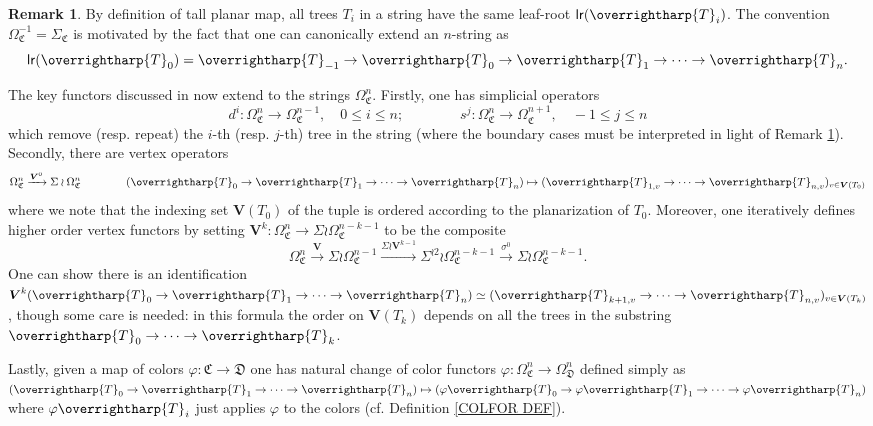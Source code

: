 \documentclass[a4paper,10pt
,draft
]{article}%
\numberwithin{equation}{section}
\numberwithin{figure}{section}
\theoremstyle{definition} %
\newtheorem{remark}[equation]{Remark}%
\newcommand{\vect}[1]{\text{\overrightharp{\ensuremath{#1}}}}
\newcommand{\1}{\ensuremath{\mathbbm 1}}%
\begin{document}
\begin{remark}\label{ADDCOROL REM}
	By definition of tall planar map, 
	all trees $T_i$ in a string have the same leaf-root
	$\mathsf{lr}(\vect{T}_i)$. The convention $\Omega^{-1}_{\mathfrak{C}} = \Sigma_{\mathfrak{C}}$ 
	is motivated by the fact that one can 
	canonically extend an $n$-string as
	\[\mathsf{lr}(\vect{T}_0)=\vect{T}_{-1} \to \vect{T}_0 \to \vect{T}_1 \to \cdots \to \vect{T}_n.\]
\end{remark}




The key functors discussed in \cite[\S 3.4]{BP_geo} now extend to the strings
$\Omega_{\mathfrak{C}}^n$.
Firstly, one has simplicial operators
\[
d^i \colon \Omega_{\mathfrak{C}}^n \to \Omega_{\mathfrak{C}}^{n-1},
\quad 0 \leq i \leq n;
\qquad \qquad
s^j \colon \Omega_{\mathfrak{C}}^{n} \to \Omega_{\mathfrak{C}}^{n+1},
\quad -1 \leq j \leq n
\]
which remove (resp. repeat) the $i$-th (resp. $j$-th) tree in the string (where the boundary cases must be interpreted in light of 
Remark \ref{ADDCOROL REM}).
Secondly, there are vertex operators
\[
\Omega^{n}_{\mathfrak{C}}
\xrightarrow{\boldsymbol{V}^0}
\Sigma \wr \Omega^{n}_{\mathfrak{C}}
\qquad \qquad
(\vect{T}_0 \to \vect{T}_1 \to \cdots \to \vect{T}_n)
\mapsto
(\vect{T}_{1,v} \to \cdots \to \vect{T}_{n,v})_{v \in \boldsymbol{V}(T_0)}
\]
where we note that the indexing set 
$\boldsymbol{V}(T_0)$ of the tuple
is ordered according to the planarization of $T_0$.
Moreover, one iteratively defines higher order vertex functors
by setting 
$\boldsymbol{V}^{k}\colon \Omega^{n}_{\mathfrak{C}}
\to \Sigma \wr \Omega^{n-k-1}_{\mathfrak{C}}$
to be the composite
\begin{equation}\label{VKDEF EQ}
\Omega^{n}_{\mathfrak{C}}
\xrightarrow{\boldsymbol{V}}
\Sigma \wr\Omega^{n-1}_{\mathfrak{C}}
\xrightarrow{\Sigma \wr \boldsymbol{V}^{k-1}}
\Sigma^{\wr 2} \wr \Omega^{n-k-1}_{\mathfrak{C}}
\xrightarrow{\sigma^0}
\Sigma \wr \Omega^{n-k-1}_{\mathfrak{C}}.
\end{equation}
One can show there is an identification
$\boldsymbol{V}^k(\vect{T}_0 \to \vect{T}_1 \to \cdots \to \vect{T}_n)
\simeq (\vect{T}_{k+1,v} \to \cdots \to \vect{T}_{n,v})_{v \in \boldsymbol{V}(T_k)}$, though some care is needed:
in this formula the order on $\boldsymbol{V}(T_k)$
depends on all the trees in the substring
$\vect{T}_0 \to \cdots \to \vect{T}_k$.

Lastly, given a map of colors 
$\varphi \colon \mathfrak{C} \to \mathfrak{D}$
one has natural change of color functors
$\varphi \colon \Omega^n_{\mathfrak{C}} \to \Omega^n_{\mathfrak{D}}$
defined simply as
$(\vect{T}_0 \to \vect{T}_1 \to \cdots \to \vect{T}_n)
\mapsto 
(\varphi\vect{T}_0 \to \varphi\vect{T}_1 \to \cdots \to \varphi\vect{T}_n)$
where $\varphi \vect{T}_i$
just applies $\varphi$ to the colors 
(cf. Definition \ref{COLFOR DEF}).
\end{document}
